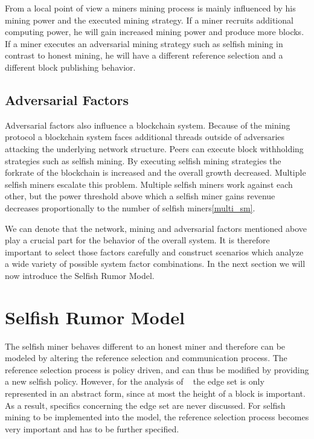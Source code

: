 From a local point of view a miners mining process is mainly influenced by his mining power and the executed mining strategy. If a miner recruits additional computing power, he will gain increased mining power and produce more blocks. If a miner executes an adversarial mining strategy such as selfish mining in contrast to honest mining, he will have a different reference selection and a different block publishing behavior.

\subsection{Adversarial Factors}
Adversarial factors also influence a blockchain system. Because of the mining protocol a blockchain system faces additional threads outside of adversaries attacking the underlying network structure. Peers can execute block withholding strategies such as selfish mining. By executing selfish mining strategies the forkrate of the blockchain is increased and the overall growth decreased. Multiple selfish miners escalate this problem. Multiple selfish miners work against each other, but the power threshold above which a selfish miner gains revenue decreases proportionally to the number of selfish miners\ref{multi_sm}.


We can denote that the network, mining and adversarial factors mentioned above play a crucial part for the behavior of the overall system. It is therefore important to select those factors carefully and construct scenarios which analyze a wide variety of possible system factor combinations. In the next section we will now introduce the Selfish Rumor Model.

\section{Selfish Rumor Model}\label{selfishmodel}
The selfish miner behaves different to an honest miner and therefore can be modeled by altering the reference selection and communication process. The reference selection process is policy driven, and can thus be modified by providing a new selfish policy. However, for the analysis of \gopalan~ the edge set is only represented in an abstract form, since at most the height of a block is important. As a result, specifics concerning the edge set are never discussed. For selfish mining to be implemented into the model, the reference selection process becomes very important and has to be further specified.
